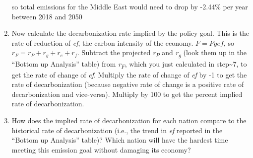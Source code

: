 \documentclass[
]{article}
\begin{document}
\begin{enumerate}
  so total emissions for the Middle East would need to drop by -2.44\%
  per year between 2018 and 2050
\item
  Now calculate the decarbonization rate implied by the policy goal.
  This is the rate of reduction of \emph{ef}, the carbon intensity of
  the economy. \(F = Pgef\), so \(r_F = r_P + r_g + r_e + r_f\).
  Subtract the projected \emph{r\textsubscript{P}} and
  \emph{r\textsubscript{g}} (look them up in the ``Bottom up Analysis''
  table) from \emph{r\textsubscript{F}}, which you just calculated in
  step\textasciitilde7, to get the rate of change of \emph{ef}. Multiply
  the rate of change of \emph{ef} by -1 to get the rate of
  decarbonization (because negative rate of change is a positive rate of
  decarbonization and vice-versa). Multiply by 100 to get the percent
  implied rate of decarbonization.
\item
  How does the implied rate of decarbonization for each nation compare
  to the historical rate of decarbonization (i.e., the trend in
  \emph{ef} reported in the ``Bottom up Analysis'' table)? Which nation
  will have the hardest time meeting this emission goal without damaging
  its economy?
\end{enumerate}
\end{document}
